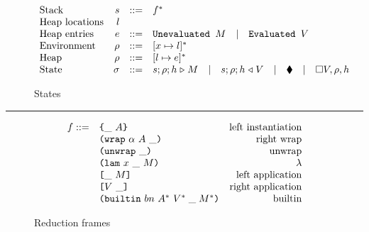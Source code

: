 
\begin{figure*}[!ht]
\caption{The L Machine}
\begin{subfigure}[c]{\linewidth}   %
{\small
\caption{States}
\[
\begin{array}{lrcl}
        \textrm{Stack}          & s      & ::= & f^*\\
        \textrm{Heap locations} & l      &  & \\
        \textrm{Heap entries}   & e      & ::= & \texttt{Unevaluated } M\quad|\quad\texttt{Evaluated } V \\
        \textrm{Environment}    & \rho   & ::= & [x \mapsto l]^*\\
        \textrm{Heap}           & \rho   & ::= & [l \mapsto e]^*\\
        \textrm{State}          & \sigma & ::= & s;\rho;h \mathrel\triangleright M \quad| \quad s;\rho;h \mathrel\triangleleft V  \quad| \quad \blacklozenge{} \quad|\quad \square V,\rho,h     
    \end{array}
\]
}
\end{subfigure}

\vspace{2mm}
\hrule
\vspace{2.5mm}

\begin{subfigure}[c]{\linewidth}     %
{
\small
\caption{Reduction frames}
\[
    \begin{array}{rlr}
      f :: = & \texttt{\{}\_ ~ A\texttt{\}}                     & \textrm{left instantiation}\\
             & \texttt{(} \texttt{wrap} ~ \alpha ~ A ~ \_ \texttt{)}            & \textrm{right wrap}\\
             & \texttt{(} \texttt{unwrap} ~ \_ \texttt{)}{}                        & \textrm{unwrap}\\
             & \texttt{(} \texttt{lam} ~ x ~ \_ ~ M \texttt{)}                   & \textrm{$\lambda$}\\
             & \texttt{[} \_ ~ M \texttt{]}                      & \textrm{left application}\\
             & \texttt{[} V ~ \_ \texttt{]}                     & \textrm{right application}\\
             & \texttt{(} \texttt{builtin} ~ bn ~ A^* ~ V^*\; \_\; M^* \texttt{)}        & \textrm{builtin}\\
    \end{array}
\]
}
\end{subfigure}


\end{figure*}
